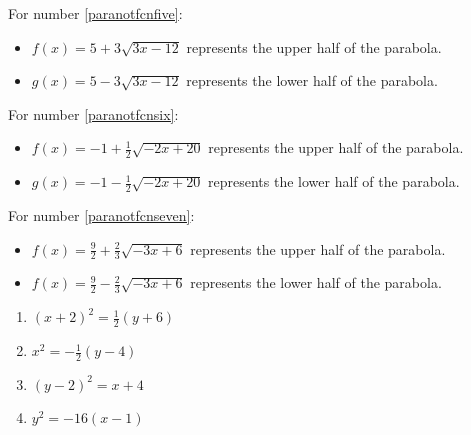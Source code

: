 \documentclass{ximera}
\begin{document}
\begin{enumerate}
\begin{itemize}
\end{itemize}


For number \ref{paranotfcnfive}:

\begin{itemize}

\item   $f(x) =5+3 \sqrt{3x-12}$ represents the upper half of the parabola.

\item  $g(x) =5- 3 \sqrt{3x-12}$ represents the lower half of the parabola.

\end{itemize}


For number \ref{paranotfcnsix}:

\begin{itemize}

\item   $f(x) =-1 + \frac{1}{2} \sqrt{-2x+20}$ represents the upper half of the parabola.

\item  $g(x) =-1 - \frac{1}{2} \sqrt{-2x+20}$ represents the lower half of the parabola.

\end{itemize}

For number \ref{paranotfcnseven}:

\begin{itemize}

\item   $f(x) = \frac{9}{2} + \frac{2}{3} \sqrt{-3x+6}$ represents the upper half of the parabola.

\item  $f(x) = \frac{9}{2} - \frac{2}{3} \sqrt{-3x+6}$ represents the lower half of the parabola.

\end{itemize}


\setcounter{HW}{\value{enumi}}
\end{enumerate}

\begin{multicols}{4}
\begin{enumerate}
\setcounter{enumi}{\value{HW}}

\item  $(x+2)^2 = \frac{1}{2} (y+6)$
\item  $x^2 = -\frac{1}{2}(y-4)$
\item $(y-2)^2=x+4$  
\item $y^2 = -16(x-1)$  


\setcounter{HW}{\value{enumi}}
\end{enumerate}
\end{multicols}
\end{document}
